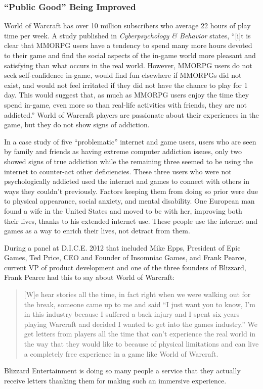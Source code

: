 \documentclass[11pt]{article}
\begin{document}
\begin{multicols}{2}
\subsubsection{``Public Good'' Being Improved}
World of Warcraft has over 10 million subscribers \cite{WoWPlayerCount} who average 22 hours of play time per week. \cite{PlayerMotivations} A study published in \emph{Cyberpsychology \& Behavior} \cite{ExcessiveUseForSocialAspects} states, ``[i]t is clear that MMORPG users have a tendency to spend many more hours devoted to their game and find the social aspects of the in-game world more pleasant and satisfying than what occurs in the real world. However, MMORPG users do not seek self-confidence in-game, would find fun elsewhere if MMORPGs did not exist, and would not feel irritated if they did not have the chance to play for 1 day. This would suggest that, as much as MMORPG users enjoy the time they spend in-game, even more so than real-life activities with friends, they are not addicted.'' World of Warcraft players are passionate about their experiences in the game, but they do not show signs of addiction.

In a case study of five ``problematic'' internet and game users, users who are seen by family and friends as having extreme computer addiction issues, only two showed signs of true addiction while the remaining three seemed to be using the internet to counter-act other deficiencies. \cite{IsThereEvidenceOfInternetAddiction} These three users who were not psychologically addicted used the internet and games to connect with others in ways they couldn't previously. Factors keeping them from doing so prior were due to physical appearance, social anxiety, and mental disability. One European man found a wife in the United States and moved to be with her, improving both their lives, thanks to his extended internet use. \cite{IsThereEvidenceOfInternetAddiction} These people use the internet and games as a way to enrich their lives, not detract from them.

During a panel at D.I.C.E. 2012 \cite{DICEInterview} that included Mike Epps, President of Epic Games, Ted Price, CEO and Founder of Insomniac Games, and Frank Pearce, current VP of product development and one of the three founders of Blizzard, Frank Pearce had this to say about World of Warcraft:
\begin{quote}
[W]e hear stories all the time, in fact right when we were walking out for the break, someone came up to me and said ``I just want you to know, I'm in this industry because I suffered a back injury and I spent six years playing Warcraft and decided I wanted to get into the games industry.'' We get letters from players all the time that can't experience the real world in the way that they would like to because of physical limitations and can live a completely free experience in a game like World of Warcraft.
\end{quote}
Blizzard Entertainment is doing so many people a service that they actually receive letters thanking them for making such an immersive experience.


\end{multicols}
\end{document}
